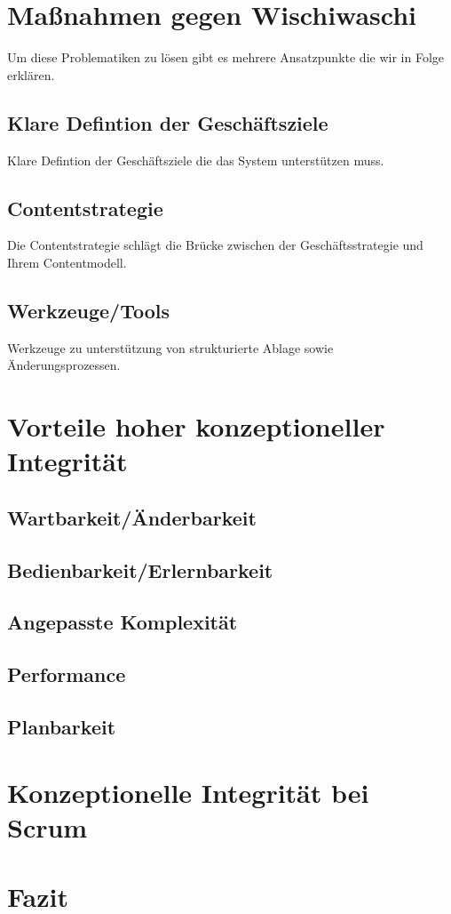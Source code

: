 \documentclass[a4paper, ngerman, 12pt, usenames, dvipsnames]{article}
\begin{document}
\section{Maßnahmen gegen Wischiwaschi}
Um diese Problematiken zu lösen gibt es mehrere Ansatzpunkte die wir in Folge erklären.
\subsection{Klare Defintion der Geschäftsziele}
Klare Defintion der Geschäftsziele die das System unterstützen muss.
\subsection{Contentstrategie}
Die Contentstrategie schlägt die Brücke zwischen der Geschäftsstrategie und Ihrem Contentmodell.
\subsection{Werkzeuge/Tools}
Werkzeuge zu unterstützung von strukturierte Ablage sowie Änderungsprozessen.\

\section{Vorteile hoher konzeptioneller Integrität}
\subsection{Wartbarkeit/Änderbarkeit}
\subsection{Bedienbarkeit/Erlernbarkeit}
\subsection{Angepasste Komplexität}
\subsection{Performance}
\subsection{Planbarkeit}
\section{Konzeptionelle Integrität bei Scrum}
\section{Fazit}



\end{document}
